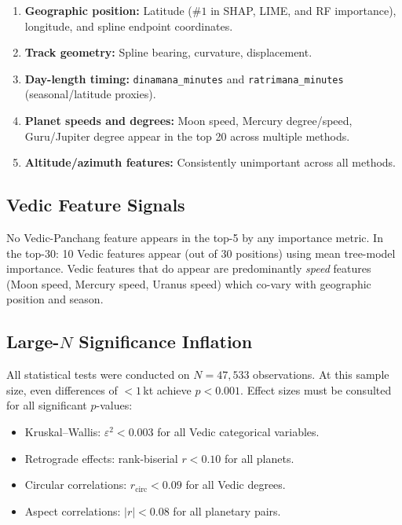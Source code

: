 \documentclass[11pt,a4paper]{article}
\begin{document}
\begin{enumerate}[noitemsep]
  \item \textbf{Geographic position:} Latitude ($\#1$ in SHAP, LIME, and RF importance),
        longitude, and spline endpoint coordinates.
  \item \textbf{Track geometry:} Spline bearing, curvature, displacement.
  \item \textbf{Day-length timing:} \texttt{dinamana\_minutes} and \texttt{ratrimana\_minutes}
        (seasonal/latitude proxies).
  \item \textbf{Planet speeds and degrees:} Moon speed, Mercury degree/speed, Guru/Jupiter
        degree appear in the top 20 across multiple methods.
  \item \textbf{Altitude/azimuth features:} Consistently unimportant across all methods.
\end{enumerate}

\subsection{Vedic Feature Signals}

No Vedic-Panchang feature appears in the top-5 by any importance metric. In the top-30:
10 Vedic features appear (out of 30 positions)
using mean tree-model importance. Vedic features that do appear are predominantly
\emph{speed} features (Moon speed, Mercury speed, Uranus speed) which co-vary with
geographic position and season.

\subsection{Large-$N$ Significance Inflation}

All statistical tests were conducted on $N = 47,533$ observations.
At this sample size, even differences of $< 1$\,kt achieve $p < 0.001$.
Effect sizes must be consulted for all significant $p$-values:

\begin{itemize}[noitemsep]
  \item Kruskal--Wallis: $\varepsilon^2 < 0.003$ for all Vedic categorical variables.
  \item Retrograde effects: rank-biserial $r < 0.10$ for all planets.
  \item Circular correlations: $r_{\text{circ}} < 0.09$ for all Vedic degrees.
  \item Aspect correlations: $|r| < 0.08$ for all planetary pairs.
\end{itemize}
\end{document}
